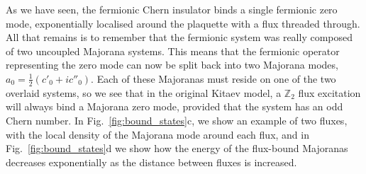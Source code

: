 As we have seen, the fermionic Chern insulator binds a single fermionic zero mode, exponentially localised around the plaquette with a flux threaded through. All that remains is to remember that the fermionic system was really composed of two uncoupled Majorana systems. This means that the fermionic operator representing the zero mode can now be split back into two Majorana modes, $a_0 = \frac 12 (c'_0 + ic''_0)$. Each of these Majoranas must reside on one of the two overlaid systems, so we see that in the original Kitaev model, a $\mathbb Z_2$ flux excitation will always bind a Majorana zero mode, provided that the system has an odd Chern number. In Fig.~\ref{fig:bound_states}c, we show an example of two fluxes, with the local density of the Majorana mode around each flux, and in Fig.~\ref{fig:bound_states}d we show how the energy of the flux-bound Majoranas decreases exponentially as the distance between fluxes is increased. 